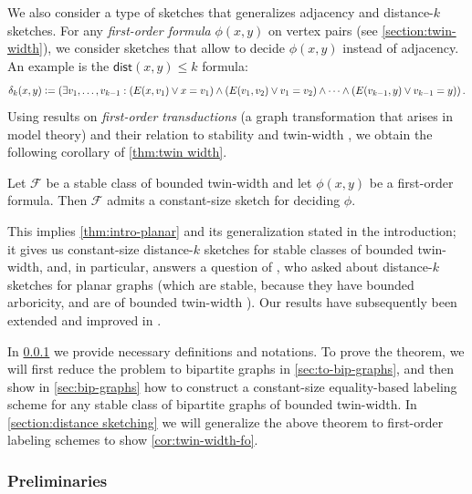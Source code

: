 \documentclass{article}
\makeatletter
\newcommand{\dist}{\mathsf{dist}}
\newcommand{\define}{\vcentcolon=}
\newcommand{\cF}{\ensuremath{\mathcal{F}}}
\newcommand\IfRestateTF{%
  \ifx\label\thmt@gobble@label %
    \expandafter\@firstoftwo
  \else
    \expandafter\@secondoftwo
  \fi
}
\newcommand{\RestateRemark}{\IfRestateTF{{\normalfont\bfseries (Restated) }}{}}
\makeatother
\begin{document}


We also consider a type of sketches that generalizes adjacency and distance-$k$ sketches.  For any
\emph{first-order formula} $\phi(x,y)$ on vertex pairs (see \cref{section:twin-width}), we consider
sketches that allow to decide $\phi(x,y)$ instead of adjacency. An example is the $\dist(x,y) \leq
k$ formula:
\[
  \delta_k(x,y) \define (\exists v_1, \dotsc, v_{k-1} : (E(x,v_1) \vee x=v_1) \wedge
(E(v_1,v_2) \vee v_1=v_2) \wedge
\dotsm \wedge (E(v_{k-1},y) \vee v_{k-1}=y)) \,.
\]
Using results on \emph{first-order transductions} (a graph transformation that arises in model
theory) and their relation to stability and twin-width \cite{BKTW20,NMP+21}, we
obtain the following corollary of \cref{thm:twin width}.

\begin{corollary}
\label{cor:twin-width-fo}
Let $\cF$ be a stable class of bounded twin-width and let $\phi(x,y)$ be a first-order formula.
Then $\cF$ admits a constant-size sketch for deciding $\phi$.
\end{corollary}

This implies
\cref{thm:intro-planar} and its generalization stated in the introduction; it gives us constant-size
distance-$k$ sketches for stable classes of bounded twin-width, and, in particular, answers a
question of \cite{Har20}, who asked about distance-$k$ sketches for planar graphs (which are stable,
because they have bounded arboricity, and are of bounded twin-width \cite{BKTW20}).  Our results
have subsequently been extended and improved in \cite{EHK22}.

In \cref{sec:tw-prelim} we provide necessary definitions and notations.
To prove the theorem, we will first reduce the problem to bipartite graphs in
\cref{sec:to-bip-graphs}, and then show in \cref{sec:bip-graphs} how to construct a constant-size
equality-based labeling scheme for any stable class of bipartite graphs of bounded twin-width.
In \cref{section:distance sketching} we will generalize the above theorem to first-order labeling
schemes to show \cref{cor:twin-width-fo}.


\subsubsection{Preliminaries}\label{sec:tw-prelim}
\end{document}
